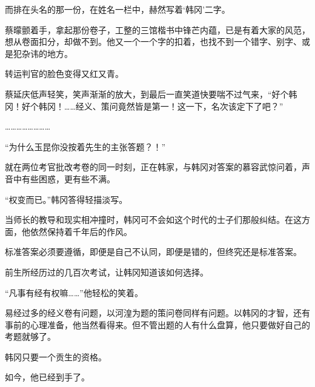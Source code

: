 而排在头名的那一份，在姓名一栏中，赫然写着‘韩冈’二字。

蔡曚颤着手，拿起那份卷子，工整的三馆楷书中锋芒内蕴，已是有着大家的风范，想从卷面扣分，却做不到。他又一个一个字的扣着，也找不到一个错字、别字、或是犯杂讳的地方。

转运判官的脸色变得又红又青。

蔡延庆低声轻笑，笑声渐渐的放大，到最后一直笑道快要喘不过气来，“好个韩冈！好个韩冈！……经义、策问竟然皆是第一！这一下，名次该定下了吧？”

……………………

“为什么玉昆你没按着先生的主张答题？！”

就在两位考官批改考卷的同一时刻，正在韩家，与韩冈对答案的慕容武惊问着，声音中有些困惑，更有些不满。

“权变而已。”韩冈答得轻描淡写。

当师长的教导和现实相冲撞时，韩冈可不会如这个时代的士子们那般纠结。在这方面，他依然保持着千年后的作风。

标准答案必须要遵循，即便是自己不认同，即便是错的，但终究还是标准答案。

前生所经历过的几百次考试，让韩冈知道该如何选择。

“凡事有经有权嘛……”他轻松的笑着。

易经过多的经义卷有问题，以河湟为题的策问卷同样有问题。以韩冈的才智，还有事前的心理准备，他当然看得来。但不管出题的人有什么盘算，他只要做好自己的考题就够了。

韩冈只要一个贡生的资格。

如今，他已经到手了。

